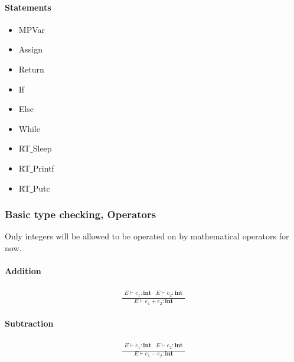 \documentclass[paper=a4, fontsize=11pt]{article}
\numberwithin{equation}{section}	%
\numberwithin{figure}{section}		%
\numberwithin{table}{section}		%
\begin{document}
            \paragraph*{Statements}
            \begin{itemize}
            	\item MPVar
            	\item Assign
            	\item Return
            	\item If
            	\item Else
            	\item While
            	\item RT$\_$Sleep
            	\item RT$\_$Printf
            	\item RT$\_$Putc
            \end{itemize}



	    \subsubsection{Basic type checking, Operators}
                Only integers will be allowed to be operated on by mathematical operators for now.
                
            \paragraph*{Addition}
            \begin{align*}
                \frac{
                \begin{array}{ll}
                E \vdash e_1 : \textbf{int} & E \vdash e_2 : \textbf{int}
                \end{array} }{E \vdash e_1+e_2 : \textbf{int}}
            \end{align*}


            \paragraph*{Subtraction}
            \begin{align*}
                \frac{
                \begin{array}{ll}
                E \vdash e_1 : \textbf{int} & E \vdash e_2 : \textbf{int}
                \end{array} }{E \vdash e_1-e_2 : \textbf{int}}
            \end{align*}
\end{document}
